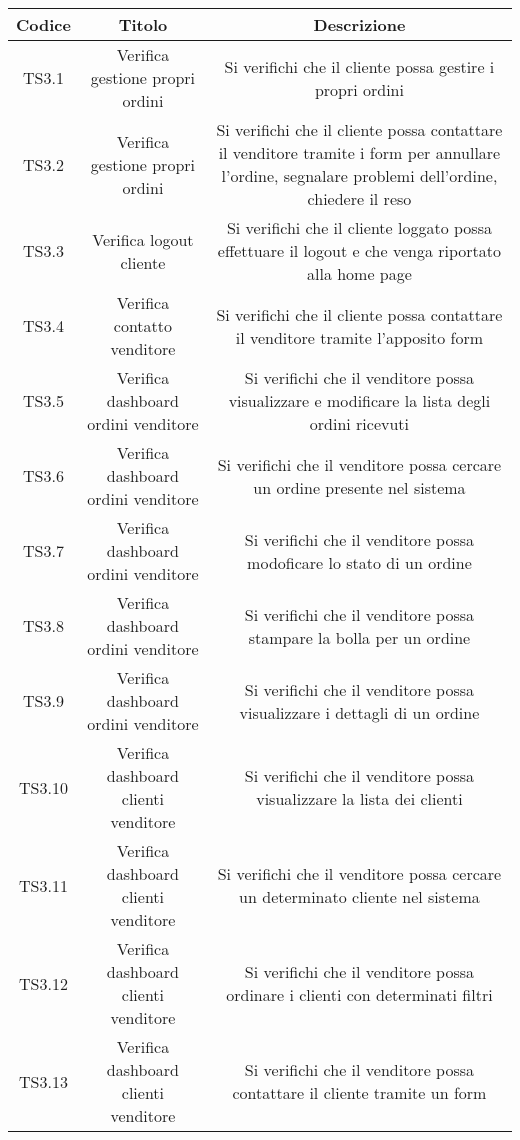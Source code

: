 \begin{center}
	\begin{longtable}{|c|c|c|}
	\hline
	\rowcolor{lighter-grayer}
	\textbf{Codice} & \textbf{Titolo} & \textbf{Descrizione} \\
	\hline
	\endfirsthead



	\hline
	TS3.1 & Verifica gestione propri ordini & Si verifichi che il cliente possa gestire i propri ordini  \\
	TS3.2 & Verifica gestione propri ordini & Si verifichi che il cliente possa contattare il venditore tramite i form per annullare l'ordine, segnalare problemi dell'ordine, chiedere il reso \\
	TS3.3 & Verifica logout cliente & Si verifichi che il cliente loggato possa effettuare il logout e che venga riportato alla home page \\
	TS3.4 & Verifica contatto venditore & Si verifichi che il cliente possa contattare il venditore tramite l'apposito form  \\
	TS3.5 & Verifica dashboard ordini venditore & Si verifichi che il venditore possa visualizzare e modificare la lista degli ordini ricevuti \\
	TS3.6 & Verifica dashboard ordini venditore & Si verifichi che il venditore possa cercare un ordine presente nel sistema \\
	TS3.7 & Verifica dashboard ordini venditore & Si verifichi che il venditore possa modoficare lo stato di un ordine  \\
	TS3.8 & Verifica dashboard ordini venditore & Si verifichi che il venditore possa stampare la bolla per un ordine  \\
	TS3.9 & Verifica dashboard ordini venditore & Si verifichi che il venditore possa visualizzare i dettagli di un ordine \\
	TS3.10 & Verifica dashboard clienti venditore & Si verifichi che il venditore possa visualizzare la lista dei clienti \\
	TS3.11 & Verifica dashboard clienti venditore & Si verifichi che il venditore possa cercare un determinato cliente nel sistema \\
	TS3.12 & Verifica dashboard clienti venditore & Si verifichi che il venditore possa ordinare i clienti con determinati filtri \\
	TS3.13 & Verifica dashboard clienti venditore & Si verifichi che il venditore possa contattare il cliente tramite un form \\

\end{longtable}
\end{center}

